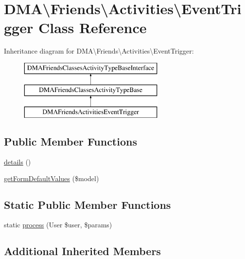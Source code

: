 \hypertarget{classDMA_1_1Friends_1_1Activities_1_1EventTrigger}{}\section{D\+M\+A\textbackslash{}Friends\textbackslash{}Activities\textbackslash{}Event\+Trigger Class Reference}
\label{classDMA_1_1Friends_1_1Activities_1_1EventTrigger}
Inheritance diagram for D\+M\+A\textbackslash{}Friends\textbackslash{}Activities\textbackslash{}Event\+Trigger\+:\begin{figure}[H]
\begin{center}
\leavevmode
\includegraphics[height=3.000000cm]{de/d31/classDMA_1_1Friends_1_1Activities_1_1EventTrigger}
\end{center}
\end{figure}
\subsection*{Public Member Functions}
\begin{DoxyCompactItemize}
\item 
\hyperlink{classDMA_1_1Friends_1_1Activities_1_1EventTrigger_a413e82d1dcf52936ce308715e96e1a39}{details} ()
\item 
\hyperlink{classDMA_1_1Friends_1_1Activities_1_1EventTrigger_a68acc002c50d305dda21ddd26ec4265b}{get\+Form\+Default\+Values} (\$model)
\end{DoxyCompactItemize}
\subsection*{Static Public Member Functions}
\begin{DoxyCompactItemize}
\item 
static \hyperlink{classDMA_1_1Friends_1_1Activities_1_1EventTrigger_a45956c83b20db41db895e61b4a13ebd6}{process} (User \$user, \$params)
\end{DoxyCompactItemize}
\subsection*{Additional Inherited Members}



